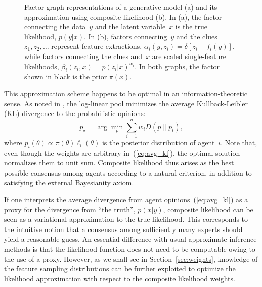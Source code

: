\documentclass[english]{scrartcl}
\begin{document}
\begin{figure}[!ht]
\begin{center}
\caption{Factor graph representations of a generative model (a) and its approximation using composite likelihood (b). In (a), the factor connecting the data~$y$ and the latent variable~$x$ is the true likelihood, $p(y|x)$. In (b), factors connecting~$y$ and the clues $z_1,z_2,\ldots$ represent feature extractions, $\alpha_i(y,z_i)=\delta[z_i-f_i(y)]$, while factors connecting the clues and~$x$ are scaled single-feature likelihoods, $\beta_i(z_i,x)=p(z_i|x)^{w_i}$. In both graphs, the factor shown in black is the prior $\pi(x)$.}
\label{fig:fgraph}
\end{center}
\end{figure}

This approximation scheme happens to be optimal in an information-theoretic sense. As noted in \cite{Garg-04}, the log-linear pool minimizes the average Kullback-Leibler (KL) divergence to the probabilistic opinions:
\begin{equation}
\label{eq:avg_kl}
p_\star = \arg\min_p \sum_{i=1}^n w_i D(p\|p_i),
\end{equation}
where $p_i(\theta) \propto \pi(\theta)\ell_i(\theta)$ is the posterior distribution of agent~$i$. Note that, even though the weights are arbitrary in~(\ref{eq:avg_kl}), the optimal solution normalizes them to unit sum. Composite likelihood thus arises as the best possible consensus among agents according to a natural criterion, in addition to satisfying the external Bayesianity axiom. 

If one interprets the average divergence from agent opinions~(\ref{eq:avg_kl}) as a proxy for the divergence from ``the truth'', $p(x|y)$, composite likelihood can be seen as a variational approximation to the true likelihood. This corresponds to the intuitive notion that a consensus among sufficiently many experts should yield a reasonable guess. An essential difference with usual approximate inference methods \cite{Bishop-06,Minka-05} is that the likelihood function does not need to be computable owing to the use of a proxy. However, as we shall see in Section~\ref{sec:weights}, knowledge of the feature sampling distributions can be further exploited to optimize the likelihood approximation with respect to the composite likelihood weights.
\end{document}
